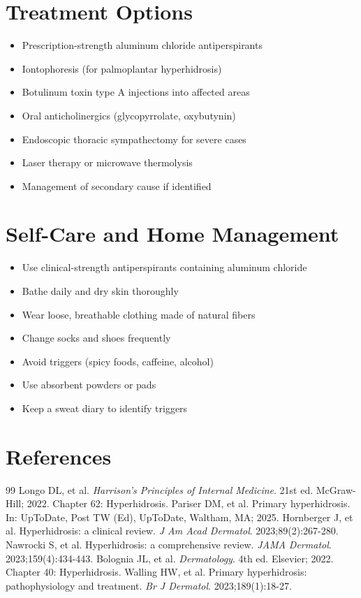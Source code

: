\section*{Treatment Options}
\begin{itemize}
\item Prescription-strength aluminum chloride antiperspirants
\item Iontophoresis (for palmoplantar hyperhidrosis)
\item Botulinum toxin type A injections into affected areas
\item Oral anticholinergics (glycopyrrolate, oxybutynin)
\item Endoscopic thoracic sympathectomy for severe cases
\item Laser therapy or microwave thermolysis
\item Management of secondary cause if identified
\end{itemize}

\section*{Self-Care and Home Management}
\begin{itemize}
\item Use clinical-strength antiperspirants containing aluminum chloride
\item Bathe daily and dry skin thoroughly
\item Wear loose, breathable clothing made of natural fibers
\item Change socks and shoes frequently
\item Avoid triggers (spicy foods, caffeine, alcohol)
\item Use absorbent powders or pads
\item Keep a sweat diary to identify triggers
\end{itemize}

\section*{References}

\begin{thebibliography}{99}
 Longo DL, et al. \emph{Harrison's Principles of Internal Medicine}. 21st ed. McGraw-Hill; 2022. Chapter 62: Hyperhidrosis.
 Pariser DM, et al. Primary hyperhidrosis. In: UpToDate, Post TW (Ed), UpToDate, Waltham, MA; 2025.
 Hornberger J, et al. Hyperhidrosis: a clinical review. \emph{J Am Acad Dermatol}. 2023;89(2):267-280.
 Nawrocki S, et al. Hyperhidrosis: a comprehensive review. \emph{JAMA Dermatol}. 2023;159(4):434-443.
 Bolognia JL, et al. \emph{Dermatology}. 4th ed. Elsevier; 2022. Chapter 40: Hyperhidrosis.
 Walling HW, et al. Primary hyperhidrosis: pathophysiology and treatment. \emph{Br J Dermatol}. 2023;189(1):18-27.
\end{thebibliography}
